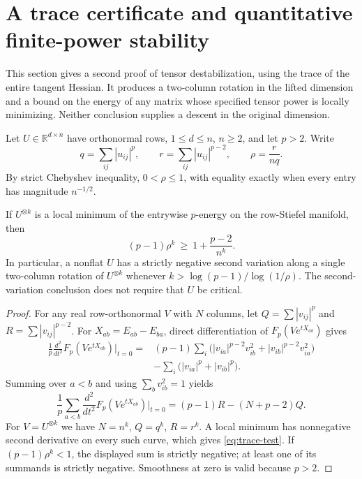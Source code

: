 \section{A trace certificate and quantitative finite-power stability}
This section gives a second proof of tensor destabilization, using the
trace of the entire tangent Hessian. It produces a two-column rotation
in the lifted dimension and a bound on the energy of any matrix whose
specified tensor power is locally minimizing. Neither conclusion
supplies a descent in the original dimension.

Let $U\in\mathbb R^{d\times n}$ have orthonormal rows, $1\le d\le n$,
$n\ge2$, and let $p>2$. Write
\[
 q=\sum_{ij}|u_{ij}|^p,\qquad r=\sum_{ij}|u_{ij}|^{p-2},
 \qquad \rho=\frac{r}{nq}.
\]
By strict Chebyshev inequality, $0<\rho\le1$, with equality exactly
when every entry has magnitude $n^{-1/2}$.

\begin{theorem}\label{thm:trace-test}
If $U^{\otimes k}$ is a local minimum of the entrywise $p$-energy on
the row-Stiefel manifold, then
\begin{equation}\label{eq:trace-test}
 (p-1)\rho^k\ \ge\ 1+\frac{p-2}{n^k}.
\end{equation}
In particular, a nonflat $U$ has a strictly negative second variation
along a single two-column rotation of $U^{\otimes k}$ whenever
$k>\log(p-1)/\log(1/\rho)$. The second-variation conclusion does not
require that $U$ be critical.
\end{theorem}

\begin{proof}
For any real row-orthonormal $V$ with $N$ columns, let
$Q=\sum |v_{ij}|^p$ and $R=\sum |v_{ij}|^{p-2}$. For
$X_{ab}=E_{ab}-E_{ba}$, direct differentiation of
$F_p(Ve^{tX_{ab}})$ gives
\begin{align*}
 \frac1p\frac{d^2}{dt^2}F_p(Ve^{tX_{ab}})\bigg|_{t=0}
 ={}&(p-1)\sum_i\bigl(|v_{ia}|^{p-2}v_{ib}^2
               +|v_{ib}|^{p-2}v_{ia}^2\bigr)\\
 &-\sum_i\bigl(|v_{ia}|^p+|v_{ib}|^p\bigr).
\end{align*}
Summing over $a<b$ and using $\sum_bv_{ib}^2=1$ yields
\begin{equation}\label{eq:curvature-trace}
 \frac1p\sum_{a<b}\frac{d^2}{dt^2}F_p(Ve^{tX_{ab}})\bigg|_{t=0}
   =(p-1)R-(N+p-2)Q.
\end{equation}
For $V=U^{\otimes k}$ we have $N=n^k$, $Q=q^k$, $R=r^k$.
A local minimum has nonnegative second derivative on every such
curve, which gives \eqref{eq:trace-test}. If
$(p-1)\rho^k<1$, the displayed sum is strictly negative; at least one
of its summands is strictly negative. Smoothness at zero is valid
because $p>2$.
\end{proof}

